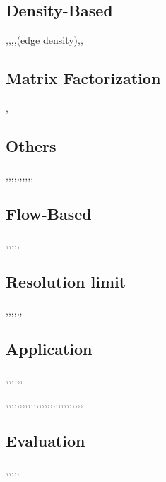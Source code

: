 \subsection{Density-Based}
\cite{huang2012revealing},\cite{gong2014novel},\cite{huang2011density},\cite{jin2013community},\cite{jia2015defining}(edge density),\cite{wang2017locating},


\subsection{Matrix Factorization}
\cite{jin2015modeling},


\subsection{Others}
\cite{yin2017local},\cite{leskovec2010empirical},\cite{chen2015deep},\cite{cai2017community},\cite{oymak2011finding},\cite{abrahao2014separability},\cite{ahn2010link},,\cite{nie2016constrained},\cite{eustace2015community},

\subsection{Flow-Based}
\cite{esquivel2011compression},\cite{li2016fast},\cite{kozdoba2015community},\cite{gong2013complex},\cite{zhu2013local},


\subsection{Resolution limit}
\cite{fortunato2007resolution},\cite{berry2011tolerating},\cite{ronhovde2010local},\cite{traag2011narrow},\cite{veldt2018correlation},\cite{schaub2012markov},\cite{xiang2015multi} 


\subsection{Application}
\cite{vsubelj2012ubiquitousness},\cite{ciglan2013community},\cite{expert2011uncovering}, \cite{faccin2014community},\cite{delmotte2011protein},

\cite{xie2011slpa},\cite{zhang2018cosine},\cite{yang2011detecting},\cite{nguyen2011adaptive},\cite{lin2009analyzing},\cite{xie2012towards},\cite{parthasarathy2011community},\cite{wang2011detecting},\cite{sachan2014spatial},\cite{tang2012community},\cite{chakraborty2015nonnegative},\cite{he2018hidden},\cite{zhao2011community},\cite{nguyen2014dynamic},\cite{wang2016improved},\cite{li2015social},\cite{tang2010community},\cite{cruz2014community},\cite{nastos2013familial},\cite{bu2013fast},\cite{chen2010game},\cite{kelley2012defining},\cite{yang2010discovering},\cite{chen2014cim},\cite{alvari2014community},\cite{xia2012community},\cite{wu2012balanced},\cite{zadeh2015multi},\cite{jin2018robust} 


\subsection{Evaluation}
\cite{mcdaid2011normalized},\cite{peel2017ground},\cite{traag2013significant},,\cite{li2018discriminative},




